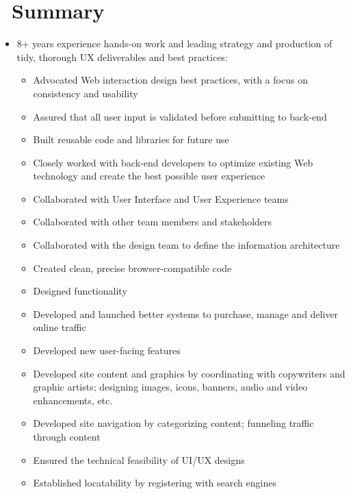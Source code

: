 \documentclass{resume}
\begin{document}



\section{\faUser\ Summary}
  \begin{itemize}
    \item 8+ years experience hands-on work and leading strategy and production of tidy, thorough UX deliverables and best practices:
    \begin{itemize}
      \item Advocated Web interaction design best practices, with a focus on consistency and usability
      \item Assured that all user input is validated before submitting to back-end
      \item Built reusable code and libraries for future use
      \item Closely worked with back-end developers to optimize existing Web technology and create the best possible user experience
      \item Collaborated with User Interface and User Experience teams
      \item Collaborated with other team members and stakeholders
      \item Collaborated with the design team to define the information architecture
      \item Created clean, precise browser-compatible code
      \item Designed functionality
      \item Developed and launched better systems to purchase, manage and deliver online traffic
      \item Developed new user-facing features
      \item Developed site content and graphics by coordinating with copywriters and graphic artists; designing images, icons, banners, audio and video enhancements, etc.
      \item Developed site navigation by categorizing content; funneling traffic through content
      \item Ensured the technical feasibility of UI/UX designs
      \item Established locatability by registering with search engines

\end{itemize}
\end{itemize}
\end{document}
